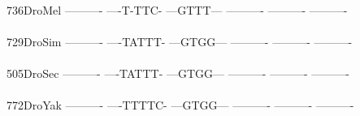 \documentclass[11pt,twoside,reqno,a4paper]{article}
\begin{document}
{\\
736\hspace*{2\charwidth}DroMel	----------	----T-TTC-	---GTTT---	----------	----------	----------	\\
\hspace*{5\charwidth}\hspace*{7\charwidth}\hspace*{1\charwidth}\hspace*{1\charwidth}\hspace*{1\charwidth}\hspace*{1\charwidth}\hspace*{1\charwidth}\hspace*{1\charwidth}\\
729\hspace*{2\charwidth}DroSim	----------	----TATTT-	---GTGG---	----------	----------	----------	\\
\hspace*{5\charwidth}\hspace*{7\charwidth}\hspace*{1\charwidth}\hspace*{1\charwidth}\hspace*{1\charwidth}\hspace*{1\charwidth}\hspace*{1\charwidth}\hspace*{1\charwidth}\\
505\hspace*{2\charwidth}DroSec	----------	----TATTT-	---GTGG---	----------	----------	----------	\\
\hspace*{5\charwidth}\hspace*{7\charwidth}\hspace*{1\charwidth}\hspace*{1\charwidth}\hspace*{1\charwidth}\hspace*{1\charwidth}\hspace*{1\charwidth}\hspace*{1\charwidth}\\
772\hspace*{2\charwidth}DroYak	----------	----TTTTC-	---GTGG---	----------	----------	----------	\\
\hspace*{5\charwidth}\hspace*{7\charwidth}\hspace*{1\charwidth}\hspace*{1\charwidth}\hspace*{1\charwidth}\hspace*{1\charwidth}\hspace*{1\charwidth}\hspace*{1\charwidth}\\
}
\end{document}
